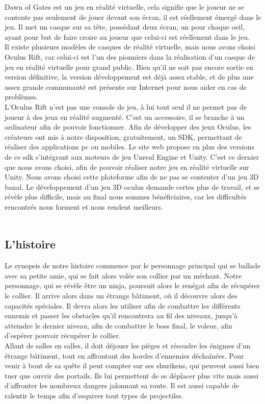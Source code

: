 \documentclass[12pt]{article}
\begin{document}
Dawn of Gates est un jeu en réalité virtuelle, cela signifie que le joueur ne se contente pas seulement de jouer devant son écran, il est réellement émergé dans le jeu. Il met un casque sur sa tête, possédant deux écran, un pour chaque oeil, ayant pour but de faire croire au joueur que celui-ci est réellement dans le jeu.\\
Il existe plusieurs modèles de casques de réalité virtuelle, mais nous avons choisi Oculus Rift, car celui-ci est l'un des pionniers dans la réalisation d'un casque de jeu en réalité virtuelle pour grand public. Bien qu'il ne soit pas encore sortie en version définitive, la version développement est déjà assez stable, et de plus une assez grande communauté est présente sur Internet pour nous aider en cas de problèmes.\\
L'Oculus Rift n'est pas une console de jeu, à lui tout seul il ne permet pas de joueur à des jeux en réalité augmenté. C'est un accessoire, il se branche à un ordinateur afin de pouvoir fonctionner. Afin de développer des jeux Oculus, les créateurs ont mis à notre disposition, gratuitement, un SDK, permettant de réaliser des applications pc ou mobiles. Le site web propose en plus des versions de ce sdk s'intégrant aux moteurs de jeu Unreal Engine et Unity. C'est ce dernier que nous avons choisi, afin de pouvoir réaliser notre jeu en réalité virtuelle sur Unity.
Nous avons choisi cette plateforme afin de ne pas se contenter d'un jeu 3D banal. Le développement d'un jeu 3D oculus demande certes plus de travail, et se révèle plus difficile, mais au final nous sommes bénéficiaires, car les difficultés rencontrés nous forment et nous rendent meilleurs.\\\\

\subsection{L'histoire}

Le synopsis de notre histoire commence par le personnage principal qui se ballade avec sa petite amie, qui se fait alors volée son collier par un méchant. Notre personnage, qui se révèle être un ninja, poursuit alors le renégat afin de récupérer le collier. Il arrive alors dans un étrange bâtiment, où il découvre alors des capacités spéciales. Il devra alors les utiliser afin de combattre les différents ennemis et passer les obstacles qu'il rencontrera au fil des niveaux, jusqu'à atteindre le dernier niveau, afin de combattre le boss final, le voleur, afin d'espérer pouvoir récupérer le collier.\\
Allant de salles en salles, il doit déjouer les pièges et résoudre les énigmes d'un étrange bâtiment, tout en affrontant des hordes d'ennemies déchaînées. Pour venir à bout de sa quête il peut compter sur ses shurikens, qui peuvent aussi bien tuer que ouvrir des portails. Ils lui permettent de se déplacer plus vite mais aussi d'affronter les nombreux dangers jalonnant sa route. Il est aussi capable de ralentir le temps afin d'esquiver tout types de projectiles.
\end{document}
